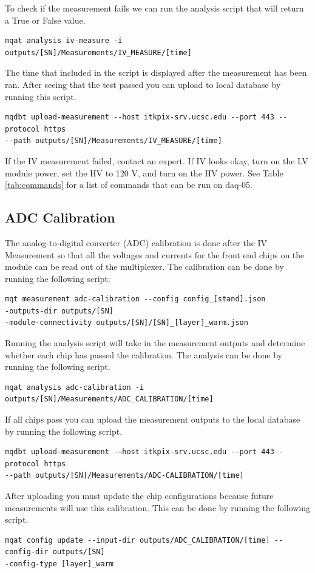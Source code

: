 \documentclass[12pt]{article}
\begin{document}
To check if the measurement fails we can run the analysis script that will return a True or False value. 
\begin{verbatim}
mqat analysis iv-measure -i outputs/[SN]/Measurements/IV_MEASURE/[time]
\end{verbatim}

The time that included in the script is displayed after the measurement has been ran. After seeing that the test passed you can upload to local database by running this script. 

\begin{verbatim}
mqdbt upload-measurement --host itkpix-srv.ucsc.edu --port 443 --protocol https
--path outputs/[SN]/Measurements/IV_MEASURE/[time]
\end{verbatim}
If the IV measurement failed, contact an expert. If IV looks okay, turn on the LV module power, set the HV to 120 V, and turn on the HV power. See Table \ref{tab:commands} for a list of commands that can be run on daq-05.


\subsection{ADC Calibration}

The analog-to-digital converter (ADC) calibration is done after the IV Measurement so that all the voltages and currents for the front end chips on the module can be read out of the multiplexer. The calibration can be done by running the following script:
\begin{verbatim}
mqt measurement adc-calibration --config config_[stand].json 
-outputs-dir outputs/[SN]
-module-connectivity outputs/[SN]/[SN]_[layer]_warm.json
\end{verbatim}


Running the analysis script will take in the measurement outputs and determine whether each chip has passed the calibration. The analysis can be done by running the following script. 

\begin{verbatim}
mqat analysis adc-calibration -i outputs/[SN]/Measurements/ADC_CALIBRATION/[time]
\end{verbatim}
If all chips pass you can upload the measurement outputs to the local database by running the following script. 
\begin{verbatim}
mqdbt upload-measurement -–host itkpix-srv.ucsc.edu --port 443 -protocol https
--path outputs/[SN]/Measurements/ADC-CALIBRATION/[time]
\end{verbatim}
After uploading you must update the chip configurations because future measurements will use this calibration. This can be done by running the following script. 
\begin{verbatim}
mqat config update --input-dir outputs/ADC_CALIBRATION/[time] --config-dir outputs/[SN] 
-config-type [layer]_warm
\end{verbatim}
\end{document}
